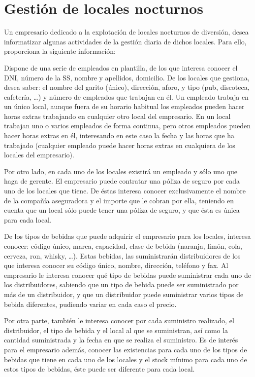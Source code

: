 \documentclass{db-practice}
\begin{document}
\section{Gestión de locales nocturnos}
Un empresario dedicado a la explotación de locales nocturnos de diversión, desea informatizar algunas actividades de la gestión diaria de dichos locales. Para ello, proporciona la siguiente información:

Dispone de una serie de empleados en plantilla, de los que interesa conocer el DNI, número de la SS, nombre y apellidos, domicilio. De los locales que gestiona, desea saber: el nombre del garito (único), dirección, aforo, y tipo (pub, discoteca, cafetería, \ldots) y número de empleados que trabajan en él. Un empleado trabaja en un único local, aunque fuera de su horario habitual los empleados pueden hacer horas extras trabajando en cualquier otro local del empresario. En un local trabajan uno o varios empleados de forma continua, pero otros empleados pueden hacer horas extras en él, interesando en este caso la fecha y las horas que ha trabajado (cualquier empleado puede hacer horas extras en cualquiera de los locales del empresario). 

Por otro lado, en cada uno de los locales existirá un empleado y sólo uno que haga de gerente. El empresario puede contratar una póliza de seguro por cada uno de los locales que tiene. De éstas interesa conocer exclusivamente el nombre de la compañía aseguradora y el importe que le cobran por ella, teniendo en cuenta que un local sólo puede tener una póliza de seguro, y que ésta es única para cada local.

De los tipos de bebidas que puede adquirir el empresario para los locales, interesa conocer: código único, marca, capacidad, clase de bebida (naranja, limón, cola, cerveza, ron, whisky, \ldots). Estas bebidas, las suministrarán distribuidores de los que interesa conocer su código único, nombre, dirección, teléfono y fax. Al empresario le interesa conocer qué tipo de bebidas puede suministrar cada uno de los distribuidores, sabiendo que un tipo de bebida puede ser suministrado por más de un distribuidor, y que un distribuidor puede suministrar varios tipos de bebida diferentes, pudiendo variar en cada caso el precio.

Por otra parte, también le interesa conocer por cada suministro realizado, el distribuidor, el tipo de bebida y el local al que se suministran, así como la cantidad suministrada y la fecha en que se realiza el suministro. Es de interés para el empresario además, conocer las existencias para cada uno de los tipos de bebidas que tiene en cada uno de los locales y el stock mínimo para cada uno de estos tipos de bebidas, éste puede ser diferente para cada local.
\end{document}
